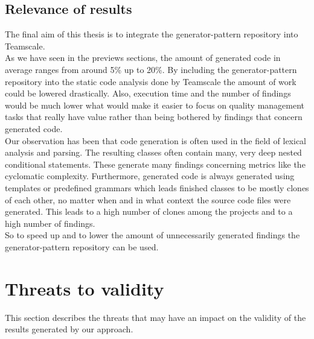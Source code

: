 \subsection{Relevance of results}
The final aim of this thesis is to integrate the generator-pattern repository into Teamscale. \\
As we have seen in the previews sections, the amount of generated code in average ranges from around 5\% up to 20\%. By including the generator-pattern repository into the static code analysis done by Teamscale the amount of work could be lowered drastically. Also, execution time and the number of findings would be much lower what would make it easier to focus on quality management tasks that really have value rather than being bothered by findings that concern generated code.\\
Our observation has been that code generation is often used in the field of lexical analysis and parsing. The resulting classes often contain many, very deep nested conditional statements. These generate many findings concerning metrics like the cyclomatic complexity. Furthermore, generated code is always generated using templates or predefined grammars which leads finished classes to be mostly clones of each other, no matter when and in what context the source code files were generated. This leads to a high number of clones among the projects and to a high number of findings.\\
So to speed up and to lower the amount of unnecessarily generated findings the generator-pattern repository can be used.

\section{Threats to validity}
This section describes the threats that may have an impact on the validity of the results generated by our approach.

